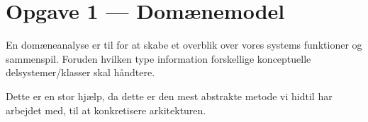 \section{Opgave 1 --- Domænemodel}
En domæneanalyse er til for at skabe et overblik over vores systems funktioner og sammenspil. Foruden hvilken type information forskellige konceptuelle delsystemer/klasser skal håndtere.

Dette er en stor hjælp, da dette er den mest abstrakte metode vi hidtil har arbejdet med, til at konkretisere arkitekturen.

